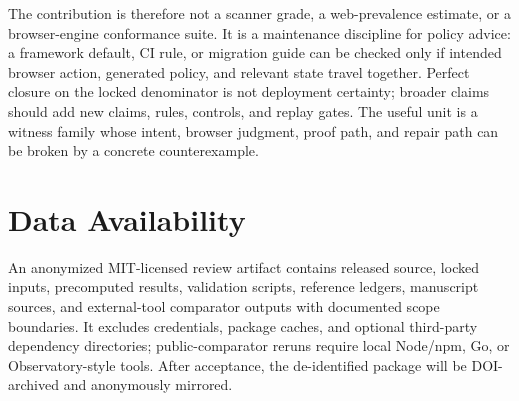 \documentclass[10pt,conference]{IEEEtran}
\begin{document}
The contribution is therefore not a scanner grade, a web-prevalence estimate, or a browser-engine conformance suite. It is a maintenance discipline for policy advice: a framework default, CI rule, or migration guide can be checked only if intended browser action, generated policy, and relevant state travel together. Perfect closure on the locked denominator is not deployment certainty; broader claims should add new claims, rules, controls, and replay gates. The useful unit is a witness family whose intent, browser judgment, proof path, and repair path can be broken by a concrete counterexample.

\section{Data Availability}

An anonymized MIT-licensed review artifact contains released source, locked inputs, precomputed results, validation scripts, reference ledgers, manuscript sources, and external-tool comparator outputs with documented scope boundaries. It excludes credentials, package caches, and optional third-party dependency directories; public-comparator reruns require local Node/npm, Go, or Observatory-style tools. After acceptance, the de-identified package will be DOI-archived and anonymously mirrored.



\end{document}
